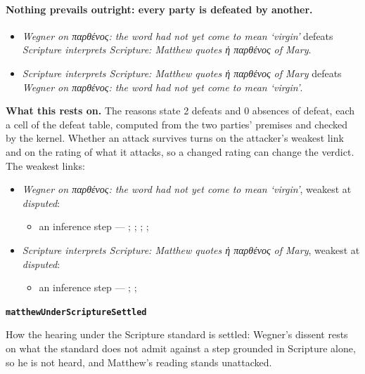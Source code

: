 \documentclass[11pt]{article}
\begin{document}
\paragraph{Nothing prevails outright: every party is defeated by another.}
\begin{itemize}
\item \emph{Wegner on παρθένος: the word had not yet come to mean ‘virgin’} defeats \emph{Scripture interprets Scripture: Matthew quotes ἡ παρθένος of Mary}.
\item \emph{Scripture interprets Scripture: Matthew quotes ἡ παρθένος of Mary} defeats \emph{Wegner on παρθένος: the word had not yet come to mean ‘virgin’}.
\end{itemize}
\par\noindent\textbf{What this rests on.} The reasons state 2 defeats and 0 absences of defeat, each a cell of the defeat table, computed from the two parties' premises and checked by the kernel. Whether an attack survives turns on the attacker's weakest link and on the rating of what it attacks, so a changed rating can change the verdict. The weakest links:
\begin{itemize}
\item \emph{Wegner on παρθένος: the word had not yet come to mean ‘virgin’}, weakest at \emph{disputed}:
\begin{itemize}
\item an inference step --- \cite[482--483]{wegner-virgin-births-2011}; \cite[67]{rhodea-did-matthew-conceive-2013}; \cite{meade-ancient-versions-comment-2013}; \cite[18--21]{rico-gentry-infant-king-2020}; \cite[112--113]{bratcher-study-of-isaiah-1958}
\end{itemize}
\item \emph{Scripture interprets Scripture: Matthew quotes ἡ παρθένος of Mary}, weakest at \emph{disputed}:
\begin{itemize}
\item an inference step --- \cite[I.ix]{westminster-confession-1647}; \cite[III.21.3]{irenaeus-against-heresies-180}; \cite[483]{wegner-virgin-births-2011}
\end{itemize}
\end{itemize}
\par\medskip\noindent\textbf{\texttt{matthew\allowbreak{}Under\allowbreak{}Scripture\allowbreak{}Settled}}\par\nobreak\noindent
How the hearing under the Scripture standard is settled: Wegner’s dissent rests on what the standard does not admit against a step grounded in Scripture alone, so he is not heard, and Matthew’s reading stands unattacked.
\end{document}
